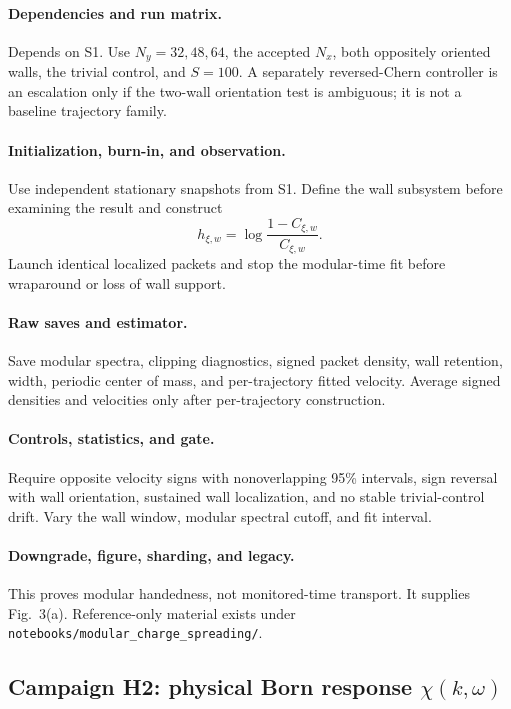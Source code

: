 \documentclass[aps,prx,onecolumn,nofootinbib,superscriptaddress,longbibliography]{revtex4-2}
\newcommand{\code}[1]{\texttt{#1}}
\begin{document}
\paragraph{Dependencies and run matrix.}
Depends on S1.  Use $N_y=32,48,64$, the accepted $N_x$, both oppositely oriented walls,
the trivial control, and $S=100$.  A separately reversed-Chern controller is an escalation
only if the two-wall
orientation test is ambiguous; it is not a baseline trajectory family.

\paragraph{Initialization, burn-in, and observation.}
Use independent stationary snapshots from S1.  Define the wall subsystem before examining
the result and construct
\begin{equation}
 h_{\xi,w}=\log\frac{1-C_{\xi,w}}{C_{\xi,w}}.
\end{equation}
Launch identical localized packets and stop the modular-time fit before wraparound or loss
of wall support.

\paragraph{Raw saves and estimator.}
Save modular spectra, clipping diagnostics, signed packet density, wall retention, width,
periodic center of mass, and per-trajectory fitted velocity.  Average signed densities and
velocities only after per-trajectory construction.

\paragraph{Controls, statistics, and gate.}
Require opposite velocity signs with nonoverlapping 95\% intervals, sign reversal with wall
orientation, sustained wall localization, and no stable trivial-control drift.  Vary the
wall window, modular spectral cutoff, and fit interval.

\paragraph{Downgrade, figure, sharding, and legacy.}
This proves modular handedness, not monitored-time transport.  It supplies Fig.~3(a).
Reference-only material exists under \code{notebooks/modular\_charge\_spreading/}.

\subsection{Campaign H2: physical Born response \texorpdfstring{$\chi(k,\omega)$}{chi(k,omega)}}
\end{document}

